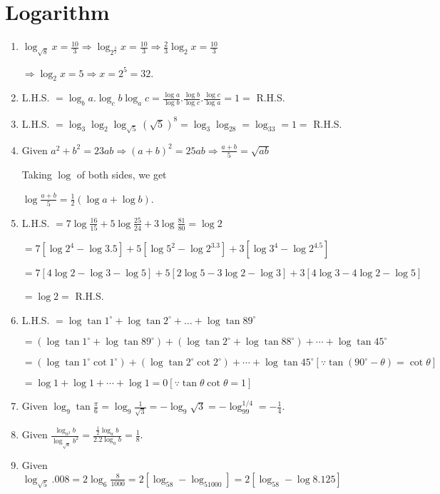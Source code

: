 \chapter{Logarithm}
\begin{enumerate}
\item $\log_{\sqrt{8}}x = \frac{10}{3} \Rightarrow \log_{2^{\tfrac{3}{2}}}x = \frac{10}{3}\Rightarrow \frac{2}{3}\log_2x = \frac{10}{3}$

  $\Rightarrow \log_2x = 5 \Rightarrow x = 2^5 = 32.$
\item L.H.S. $= \log_ba.\log_cb\log_ac = \frac{\log a}{\log b}.\frac{\log b}{\log c}.\frac{\log c}{\log a} = 1 =$ R.H.S.
\item L.H.S. $= \log_3\log_2\log_{\sqrt{5}}(\sqrt{5})^8 = \log_3\log_28 = \log_33 = 1 =$ R.H.S.
\item Given $a^2 + b^2 = 23ab \Rightarrow (a + b)^2 = 25ab \Rightarrow \frac{a + b}{5} = \sqrt{ab}$

  Taking $\log$ of both sides, we get

  $\log\frac{a + b}{5} = \frac{1}{2}(\log a + \log b)$.
\item L.H.S. $= 7\log\frac{16}{15} + 5\log\frac{25}{24} + 3\log\frac{81}{80} = \log 2$

  $= 7[\log 2^4 - \log 3.5] + 5[\log 5^2 - \log 2^3.3] + 3[\log 3^4 - \log 2^4.5]$

  $= 7[4\log 2 - \log 3 - \log 5] + 5[2\log 5 - 3\log 2 - \log 3] + 3[4\log 3 - 4\log 2 - \log 5]$

  $= \log 2 =$ R.H.S.
\item L.H.S. $= \log\tan1^\circ + \log\tan2^\circ + \ldots + \log\tan89^\circ$

  $= (\log\tan1^\circ + \log\tan89^\circ) + (\log\tan2^\circ + \log\tan88^\circ) + \cdots + \log\tan45^\circ$

  $=(\log\tan1^\circ\cot1^\circ) + (\log\tan2^\circ\cot2^\circ) + \cdots + \log\tan45^\circ [\because \tan(90^\circ - \theta) =
  \cot\theta]$

  $= \log 1 + \log 1 + \cdots + \log 1 = 0 [\because \tan\theta\cot\theta = 1]$
\item Given $\log_9\tan\frac{\pi}{6} = \log_9\frac{1}{\sqrt{3}} = -\log_9\sqrt{3} = -\log_99^{1/4} = -\frac{1}{4}$.
\item Given $\frac{\log_{a^2}b}{\log_{\sqrt{a}}b^2} = \frac{\frac{1}{2}\log_ab}{2.2\log_ab} = \frac{1}{8}$.
\item Given $\log_{\sqrt{5}}.008 = 2\log_6\frac{8}{1000} = 2[\log_58 - \log_51000] = 2[\log_58 - \log 8.125]$


\end{enumerate}

